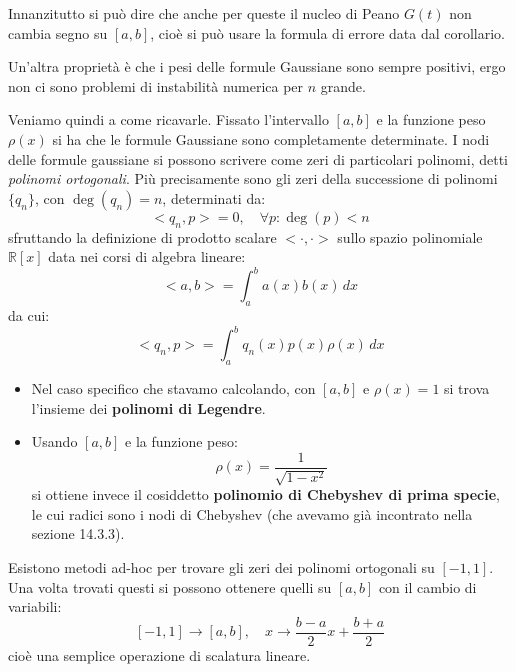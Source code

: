 \documentclass[a4paper,11pt]{article}
\begin{document}
Innanzitutto si può dire che anche per queste il nucleo di Peano $G(t)$ non cambia segno su $[a, b]$, cioè si può usare la formula di errore data dal corollario.

Un'altra proprietà è che i pesi delle formule Gaussiane sono sempre positivi, ergo non ci sono problemi di instabilità numerica per $n$ grande.

Veniamo quindi a come ricavarle.
Fissato l'intervallo $[a, b]$ e la funzione peso $\rho(x)$ si ha che le formule Gaussiane sono completamente determinate.
I nodi delle formule gaussiane si possono scrivere come zeri di particolari polinomi, detti \textit{polinomi ortogonali}.
Più precisamente sono gli zeri della successione di polinomi $\{q_n\}$, con $\deg(q_n) = n$, determinati da:
$$
< q_n, p > = 0 , \quad \forall p : \deg(p) < n
$$
sfruttando la definizione di prodotto scalare $< \cdot , \cdot >$ sullo spazio polinomiale $\mathbb{R}[x]$ data nei corsi di algebra lineare:
$$
<a, b> = \int_a^b a(x) b(x) \, dx
$$
da cui:
$$
< q_n, p > = \int_a^b q_n(x) p(x) \rho(x) \, dx
$$

\begin{itemize}
	\item
		Nel caso specifico che stavamo calcolando, con $[a, b]$ e $\rho(x) = 1$ si trova l'insieme dei \textbf{polinomi di Legendre}.
	\item 
		Usando $[a, b]$ e la funzione peso:
		$$
		\rho(x) = \frac{1}{\sqrt{1 - x^2}}
		$$
		si ottiene invece il cosiddetto \textbf{polinomio di Chebyshev di prima specie}, le cui radici sono i nodi di Chebyshev (che avevamo già incontrato nella sezione 14.3.3).
\end{itemize}

Esistono metodi ad-hoc per trovare gli zeri dei polinomi ortogonali su $[-1, 1]$. 
Una volta trovati questi si possono ottenere quelli su $[a, b]$ con il cambio di variabili:
$$
[-1, 1] \rightarrow [a, b], \quad x \rightarrow \frac{b - a}{2} x + \frac{b + a}{2}
$$
cioè una semplice operazione di scalatura lineare.
\end{document}

